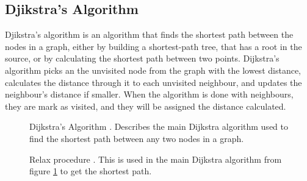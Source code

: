 \subsection{Djikstra's Algorithm}
\label{sec:dijkstra}

Djikstra's algorithm is an algorithm that finds the shortest path between the nodes in a graph, either by building a shortest-path tree, that has a root in the source, or by calculating the shortest path between two points. Dijkstra's algorithm picks an the unvisited node from the graph with the lowest distance, calculates the distance through it to each unvisited neighbour, and updates the neighbour's distance if smaller. When the algorithm is done with neighbours, they are mark as visited, and they will be assigned the distance calculated.

\begin{figure}[H]
    \centering
    \centering
    \caption{Dijkstra's Algorithm \cite{cormen}. Describes the main Dijkstra algorithm used to find the shortest path between any two nodes in a graph.}
    \label{fig:dijkstra-algorithm}
\end{figure}

\begin{figure}[H]
    \centering
    \centering
    \caption{Relax procedure \cite{cormen}. This is used in the main Dijkstra algorithm from figure \ref{fig:dijkstra-algorithm} to get the shortest path.}
    \label{fig:relax-procedure}
\end{figure}

